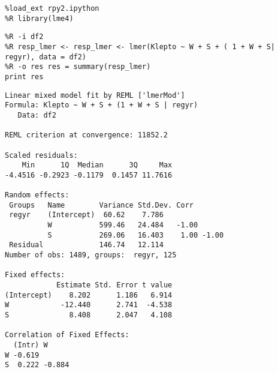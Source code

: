 \documentclass[12pt,fleqn]{article}\usepackage{common}
\begin{document}
\begin{verbatim}
%load_ext rpy2.ipython
%R library(lme4)
\end{verbatim}

\begin{verbatim}
%R -i df2
%R resp_lmer <- resp_lmer <- lmer(Klepto ~ W + S + ( 1 + W + S| regyr), data = df2)
%R -o res res = summary(resp_lmer)
print res
\end{verbatim}

\begin{verbatim}
Linear mixed model fit by REML ['lmerMod']
Formula: Klepto ~ W + S + (1 + W + S | regyr)
   Data: df2

REML criterion at convergence: 11852.2

Scaled residuals: 
    Min      1Q  Median      3Q     Max 
-4.4516 -0.2923 -0.1179  0.1457 11.7616 

Random effects:
 Groups   Name        Variance Std.Dev. Corr       
 regyr    (Intercept)  60.62    7.786              
          W           599.46   24.484   -1.00      
          S           269.06   16.403    1.00 -1.00
 Residual             146.74   12.114              
Number of obs: 1489, groups:  regyr, 125

Fixed effects:
            Estimate Std. Error t value
(Intercept)    8.202      1.186   6.914
W            -12.440      2.741  -4.538
S              8.408      2.047   4.108

Correlation of Fixed Effects:
  (Intr) W     
W -0.619       
S  0.222 -0.884

\end{verbatim}
\end{document}
